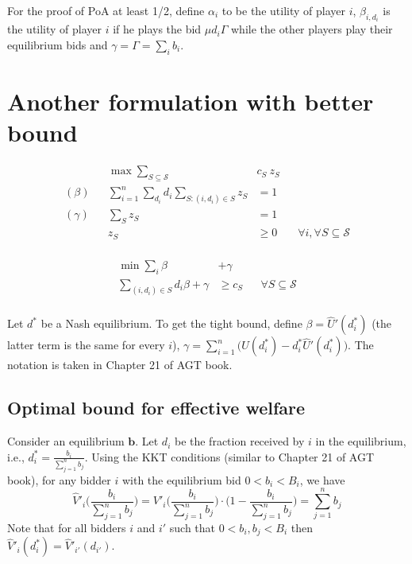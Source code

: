 \documentclass[11pt,a4paper]{article}
\newcommand{\vect}[1]{\ensuremath{\mathbf{#1}}}
\begin{document}
For the proof of PoA at least 1/2, define $\alpha_{i}$ to be the utility of player $i$, $\beta_{i,d_{i}}$ is the utility of player $i$ if he plays 
the bid $\mu d_{i} \Gamma$ while the other players play their equilibrium bids and $\gamma = \Gamma = \sum_{i} b_{i}$. 

\section{Another formulation with better bound}

\begin{minipage}[t]{0.59\textwidth}
	\begin{align*}
		&& \max  \sum_{S \subseteq \mathcal{S}} &c_{S}\ z_{S} \\
		(\beta) && \sum_{i=1}^{n} \sum_{d_{i}} d_{i} \sum_{S: (i,d_{i}) \in S } z_{S} &= 1 & & \\
		(\gamma) && \sum_{S} z_{S}  &= 1	& & \\
		&& z_{S} &\geq 0 & & \forall i, \forall S \subseteq \mathcal{S}\\
	\end{align*}
\end{minipage}
\begin{minipage}[t]{0.3\textwidth}
	\begin{align*}
		\min \sum_{i} \beta &+ \gamma \\
		\sum_{(i,d_{i}) \in S} d_{i} \beta + \gamma &\geq c_{S}  & & \forall S \subseteq \mathcal{S}\\
\end{align*}
\end{minipage}

Let $d^{*}$ be a Nash equilibrium.  
To get the tight bound, define $\beta = \hat{U}'(d^{*}_{i})$ (the latter term is the same for every $i$), $\gamma = \sum_{i=1}^{n} \bigl( U(d^{*}_{i}) - d^{*}_{i}\hat{U}'(d^{*}_{i}) \bigr)$. 
The notation is taken in Chapter 21 of AGT book. 

\subsection{Optimal bound for effective welfare}
Consider an equilibrium $\vect{b}$. Let $d_{i}$ be the fraction received by $i$ in the equilibrium, i.e., $d^{*}_{i} = \frac{b_{i}}{\sum_{j=1}^{n} b_{j}}$.
Using the KKT conditions (similar to Chapter 21 of AGT book), for any bidder $i$ with the equilibrium bid $0 < b_{i} < B_{i}$, we have
$$
\hat{V}'_{i}\biggl( \frac{b_{i}}{\sum_{j=1}^{n} b_{j}} \biggr) 
= V'_{i}\biggl( \frac{b_{i}}{\sum_{j=1}^{n} b_{j}} \biggr) \cdot \biggl( 1 - \frac{b_{i}}{\sum_{j=1}^{n} b_{j}} \biggr) 
= \sum_{j=1}^{n} b_{j}
$$
Note that for all bidders $i$ and $i'$ such that $0 < b_{i}, b_{j} < B_{i}$ then 
$ \hat{V}'_{i}(d^{*}_{i})  = \hat{V}'_{i'}(d_{i'})$.
\end{document}
